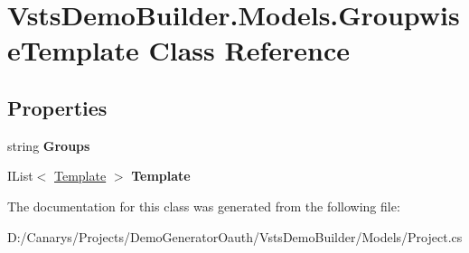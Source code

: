 \hypertarget{class_vsts_demo_builder_1_1_models_1_1_groupwise_template}{}\section{Vsts\+Demo\+Builder.\+Models.\+Groupwise\+Template Class Reference}
\label{class_vsts_demo_builder_1_1_models_1_1_groupwise_template}
\subsection*{Properties}
\begin{DoxyCompactItemize}
\item 
\mbox{\label{class_vsts_demo_builder_1_1_models_1_1_groupwise_template_a4c953711dc5fbad16f53dee452ede241}} 
string {\bfseries Groups}
\item 
\mbox{\label{class_vsts_demo_builder_1_1_models_1_1_groupwise_template_a07113f35e3c16fe11906eacf091bbee2}} 
I\+List$<$ \mbox{\hyperlink{class_vsts_demo_builder_1_1_models_1_1_template}{Template}} $>$ {\bfseries Template}
\end{DoxyCompactItemize}


The documentation for this class was generated from the following file\+:\begin{DoxyCompactItemize}
\item 
D\+:/\+Canarys/\+Projects/\+Demo\+Generator\+Oauth/\+Vsts\+Demo\+Builder/\+Models/Project.\+cs\end{DoxyCompactItemize}
